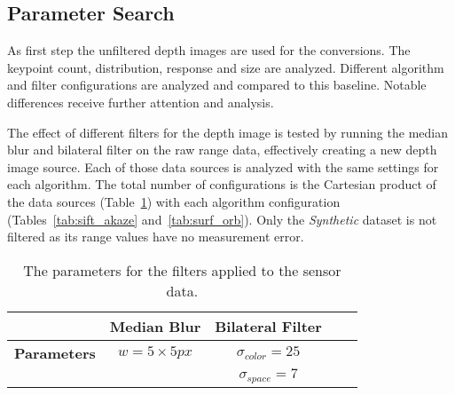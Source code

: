\subsection{Parameter Search}

As first step the unfiltered depth images are used for the conversions.
The keypoint count, distribution, response and size are analyzed.
Different algorithm and filter configurations are analyzed and compared to this baseline.
Notable differences receive further attention and analysis.

The effect of different filters for the depth image is tested by running the median blur and bilateral filter on the raw range data, effectively creating a new depth image source.
Each of those data sources is analyzed with the same settings for each algorithm.
The total number of configurations is the Cartesian product of the data sources (Table~\ref{tab:filter}) with each algorithm configuration (Tables~\ref{tab:sift_akaze} and~\ref{tab:surf_orb}).
Only the \emph{Synthetic} dataset is not filtered as its range values have no measurement error.
\begin{table}[H]
    {\renewcommand{\arraystretch}{1.3}%
    \setlength{\tabcolsep}{0.8em}%
    \footnotesize
    \begin{tabular}{ccccc}
    \toprule
    \null & \textbf{Median Blur} & \textbf{Bilateral Filter} \\
    \midrule
    \textbf{Parameters}
        & $w = 5 \times 5px$
        & $\sigma_{color} = 25$ \\
    \null & \null & $\sigma_{space} = 7$ \\
    \bottomrule
    \end{tabular}
    }
    \caption{The parameters for the filters applied to the sensor data.}\label{tab:filter}
\end{table}
